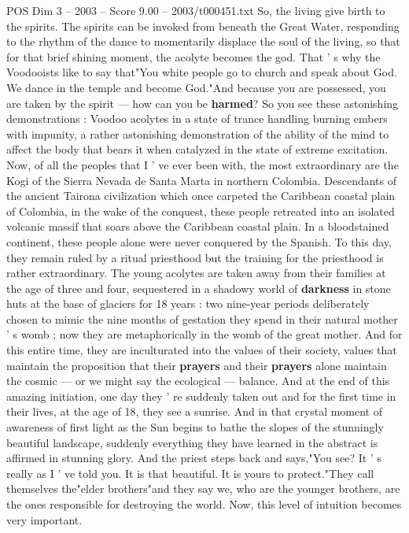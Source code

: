 \begin{textsample}{POS Dim 3 – 2003 – Score 9.00 – 2003/t000451.txt}
So, the living give birth to the spirits.
The spirits can be invoked from beneath the Great Water, responding to the rhythm of the dance to momentarily displace the soul of the living, so that for that brief shining moment, the acolyte becomes the god.
That ' s why the Voodooists like to say that"You white people go to church and speak about God.
We dance in the temple and become God."And because you are possessed, you are taken by the spirit — how can you be \textbf{harmed}?
So you see these astonishing demonstrations : Voodoo acolytes in a state of trance handling burning embers with impunity, a rather astonishing demonstration of the ability of the mind to affect the body that bears it when catalyzed in the state of extreme excitation.
Now, of all the peoples that I ' ve ever been with, the most extraordinary are the Kogi of the Sierra Nevada de Santa Marta in northern Colombia.
Descendants of the ancient Tairona civilization which once carpeted the Caribbean coastal plain of Colombia, in the wake of the conquest, these people retreated into an isolated volcanic massif that soars above the Caribbean coastal plain.
In a bloodstained continent, these people alone were never conquered by the Spanish.
To this day, they remain ruled by a ritual priesthood but the training for the priesthood is rather extraordinary.
The young acolytes are taken away from their families at the age of three and four, sequestered in a shadowy world of \textbf{darkness} in stone huts at the base of glaciers for 18 years : two nine-year periods deliberately chosen to mimic the nine months of gestation they spend in their natural mother ' s womb ; now they are metaphorically in the womb of the great mother.
And for this entire time, they are inculturated into the values of their society, values that maintain the proposition that their \textbf{prayers} and their \textbf{prayers} alone maintain the cosmic — or we might say the ecological — balance.
And at the end of this amazing initiation, one day they ' re suddenly taken out and for the first time in their lives, at the age of 18, they see a sunrise.
And in that crystal moment of awareness of first light as the Sun begins to bathe the slopes of the stunningly beautiful landscape, suddenly everything they have learned in the abstract is affirmed in stunning glory.
And the priest steps back and says,"You see?
It ' s really as I ' ve told you.
It is that beautiful.
It is yours to protect."They call themselves the"elder brothers"and they say we, who are the younger brothers, are the ones responsible for destroying the world.
Now, this level of intuition becomes very important.

\end{textsample}
